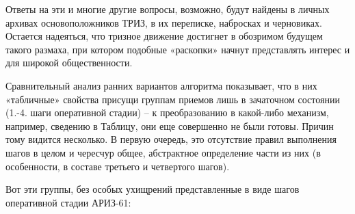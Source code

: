 \documentclass[11pt,a4paper]{article}
\begin{document}
Ответы на эти и многие другие вопросы, возможно, будут найдены в личных
архивах основоположников ТРИЗ, в их переписке, набросках и черновиках.
Остается надеяться, что тризное движение достигнет в обозримом будущем такого
размаха, при котором подобные «раскопки» начнут представлять интерес и для
широкой общественности.

Сравнительный анализ ранних вариантов алгоритма показывает, что в них
«табличные» свойства присущи группам приемов лишь в зачаточном состоянии
(1.-4. шаги оперативной стадии) -- к преобразованию в какой-либо механизм,
например, сведению в Таблицу, они еще совершенно не были готовы. Причин тому
видится несколько. В первую очередь, это отсутствие правил выполнения шагов в
целом и чересчур общее, абстрактное определение части из них (в особенности, в
составе третьего и четвертого шагов).

Вот эти группы, без особых ухищрений представленные в виде шагов оперативной
стадии АРИЗ-61:
\end{document}
